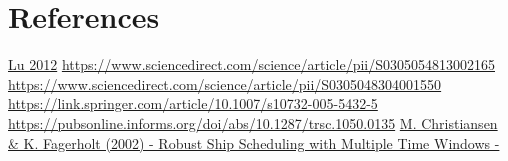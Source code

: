 \documentclass[a4paper,12pt]{article}
\begin{document}
\section{References} \label{sec:Ref}

\href{http://www-bcf.usc.edu/~maged/publications/MultiplePickup.pdf}{Lu 2012} \newline
\url{https://www.sciencedirect.com/science/article/pii/S0305054813002165} \newline
\url{https://www.sciencedirect.com/science/article/pii/S0305048304001550} \newline
\url{https://link.springer.com/article/10.1007/s10732-005-5432-5} \newline
\url{https://pubsonline.informs.org/doi/abs/10.1287/trsc.1050.0135} \newline
\href{https://onlinelibrary.wiley.com/doi/epdf/10.1002/nav.10033}{M. Christiansen \& K. Fagerholt (2002) - Robust Ship Scheduling with Multiple Time Windows - } \newline
\end{document}
